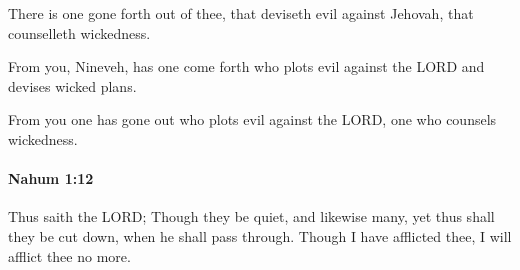 			\begin{versebox}
					\item[BHS] 
					\item[LXX] 
					\item[ASV] There is one gone forth out of thee, that deviseth evil against Jehovah, that counselleth wickedness.
					\item[NIV] From you, Nineveh, has one come forth who plots evil against the LORD and devises wicked plans.
					\item[NRSV] From you one has gone out who plots evil against the LORD, one who counsels wickedness.
			\end{versebox}

		\paragraph{Nahum 1:12} %
			\label{NAHUM-1-12}

			Thus saith the LORD; Though they be quiet, and likewise many, yet thus shall they be cut down, when he shall pass through. Though I have afflicted thee, I will afflict thee no more.

